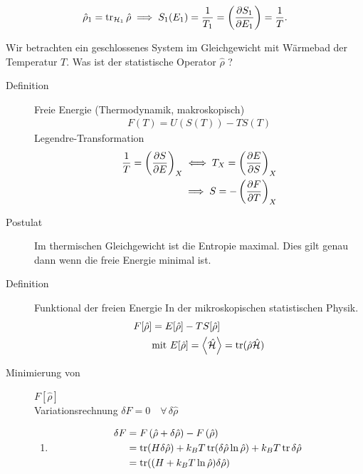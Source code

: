 %

%
\begin{align*}
  \hat{\rho}_1 = \operatorname{tr}_{\mathcal{H}_1} \hat{\rho} \implies S_1 (E_1) = 
  \frac{1}{T_1} = \left( \frac{\partial S_1 }{\partial E_1} \right) = \frac{1}{T} .
\end{align*}
%

Wir betrachten ein geschlossenes System im Gleichgewicht mit W\"armebad der 
Temperatur $T$. Was ist der statistische Operator $\hat{\rho}$ ?

\begin{description}
  \item[Definition]  Freie Energie (Thermodynamik, makroskopisch)
    \begin{align*}
      F(T) = U(S(T)) - T S(T)
    \end{align*}
    Legendre-Transformation
    \begin{align*}
      \frac{1}{T} = \left( \frac{\partial S }{\partial E} \right)_X \iff T_X =
      \left( \frac{\partial E }{\partial S} \right)_X \\
      \implies S = - \left( \frac{\partial F }{\partial T} \right)_X
    \end{align*}
  \item[Postulat] Im thermischen Gleichgewicht ist die Entropie maximal. 
    Dies gilt genau dann wenn die freie Energie minimal ist.
  \item[Definition] Funktional der freien Energie In der 
    mikroskopischen statistischen Physik.
    \begin{align*}
      F[\hat{\rho}] & = E[\hat{\rho}] - T S [\hat{\rho}] \\
                    & \text{mit } E [\hat{\rho}] = \Braket{\hat{ \mathcal{H}}}
      = \operatorname{tr} (\hat{\rho} \hat{ \mathcal{H}})
    \end{align*}
  \item[Minimierung von ] $F[\hat{\rho}]$ \\
    Variationsrechnung $\delta F= 0 \quad\forall\, \delta \hat{\rho}$
    \begin{enumerate}
      \item %
      \begin{align*}
          \delta F & = F \left( \hat{\rho} + \delta \hat{ \rho} \right) -
          F \left( \hat{\rho} \right) \\ & = \trace (H \delta \hat{\rho}) 
        + k_B T \trace (\delta \hat{\rho} \ln{\hat{\rho}}) + k_B T \trace
        \delta \hat{\rho} \\ & = \trace ( ( H+ k_B T \ln{ \hat{\rho}}) \delta \hat{\rho}) \\

\end{align*}
\end{enumerate}
\end{description}
